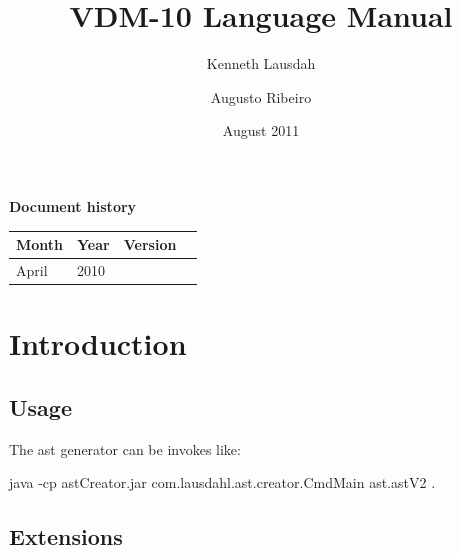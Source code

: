 \documentclass{overturerepchap}
\begin{document}
 
\title{VDM-10 Language Manual}
\author{ Kenneth Lausdah \and Augusto Ribeiro}

\date{August 2011}

\maketitle


{\textbf{Document history}}

\begin{tabular}{|l|l|l|l|}\hline
Month   & Year & Version \\ \hline
April   & 2010 &    \\ \hline
\end{tabular}

\tableofcontents
\newpage
\mbox{}
\newpage
{} 
\setcounter{page}{1}

\chapter{Introduction}



\section{Usage}
The ast generator can be invokes like: 

\begin{astlst}
java -cp astCreator.jar com.lausdahl.ast.creator.CmdMain ast.astV2 .
\end{astlst}

\section{Extensions}


\end{document}
